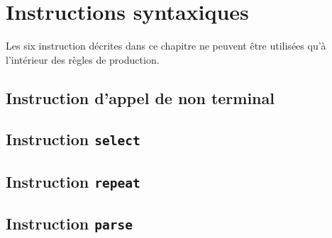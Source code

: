 
\chapter{Instructions syntaxiques}

Les six instruction décrites dans ce chapitre ne peuvent être utilisées qu'à l'intérieur des règles de production.








\section{Instruction d'appel de non terminal}





\section{Instruction \texttt{select}}








\section{Instruction \texttt{repeat}}







\section{Instruction \texttt{parse}}











